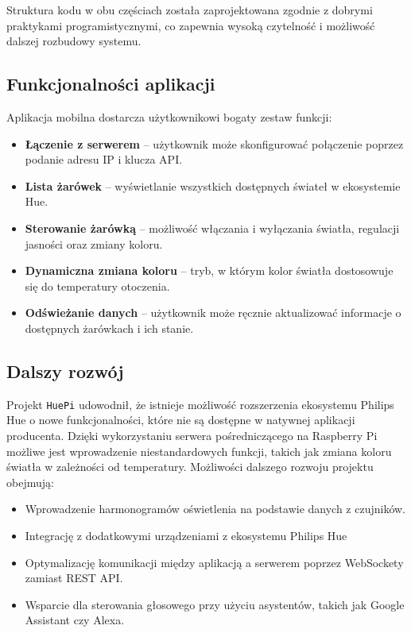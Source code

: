 \documentclass[12pt]{article}
\begin{document}
\noindent Struktura kodu w obu częściach została zaprojektowana zgodnie z dobrymi praktykami programistycznymi, co zapewnia wysoką czytelność i możliwość dalszej rozbudowy systemu.

\subsection{Funkcjonalności aplikacji}
\noindent Aplikacja mobilna dostarcza użytkownikowi bogaty zestaw funkcji:
\begin{itemize}
    \item \textbf{Łączenie z serwerem} – użytkownik może skonfigurować połączenie poprzez podanie adresu IP i klucza API.
    \item \textbf{Lista żarówek} – wyświetlanie wszystkich dostępnych świateł w ekosystemie Hue.
    \item \textbf{Sterowanie żarówką} – możliwość włączania i wyłączania światła, regulacji jasności oraz zmiany koloru.
    \item \textbf{Dynamiczna zmiana koloru} – tryb, w którym kolor światła dostosowuje się do temperatury otoczenia.
    \item \textbf{Odświeżanie danych} – użytkownik może ręcznie aktualizować informacje o dostępnych żarówkach i ich stanie.
\end{itemize}

\subsection{Dalszy rozwój}
\noindent Projekt \texttt{HuePi} udowodnił, że istnieje możliwość rozszerzenia ekosystemu Philips Hue o nowe funkcjonalności, które nie są dostępne w natywnej aplikacji producenta. Dzięki wykorzystaniu
serwera pośredniczącego na Raspberry Pi możliwe jest wprowadzenie niestandardowych funkcji, takich jak zmiana koloru światła w zależności od temperatury. Możliwości dalszego rozwoju projektu obejmują:
\begin{itemize}
    \item Wprowadzenie harmonogramów oświetlenia na podstawie danych z czujników.
    \item Integrację z dodatkowymi urządzeniami z ekosystemu Philips Hue 
    \item Optymalizację komunikacji między aplikacją a serwerem poprzez WebSockety zamiast REST API.
    \item Wsparcie dla sterowania głosowego przy użyciu asystentów, takich jak Google Assistant czy Alexa.
\end{itemize}
\end{document}
